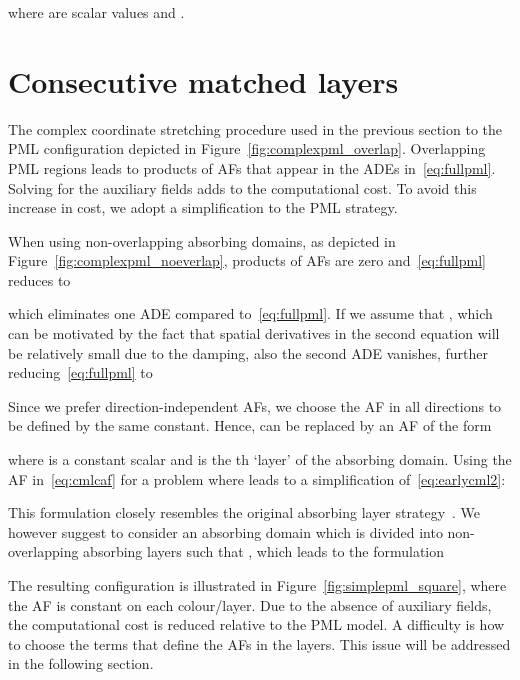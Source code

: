 \documentclass[a4paper]{article}
\begin{document}
where  are scalar values and .

\section{Consecutive matched layers}
\label{sec:cml}

The complex coordinate stretching procedure used in the previous
section to the PML configuration depicted in
Figure~\ref{fig:complexpml_overlap}. Overlapping PML regions leads to
products of AFs that appear in the ADEs in~\eqref{eq:fullpml}. Solving
for the auxiliary fields adds to the computational cost.  To avoid
this increase in cost, we adopt a simplification to the PML strategy.

When using non-overlapping absorbing domains, as depicted in
Figure~\ref{fig:complexpml_noeverlap}, products of AFs are zero
and~\eqref{eq:fullpml} reduces to

which eliminates one ADE compared to~\eqref{eq:fullpml}. If we assume
that , which can be motivated by the fact that
spatial derivatives in the second equation will be relatively small
due to the damping, also the second ADE vanishes, further
reducing~\eqref{eq:fullpml} to

Since we prefer direction-independent AFs, we choose the AF in all
directions to be defined by the same constant. Hence, 
can be replaced by an AF of the form

where  is a constant scalar and  is the th
`layer' of the absorbing domain.  Using the AF in~\eqref{eq:cmlcaf}
for a problem where  leads to a
simplification of~\eqref{eq:earlycml2}:

This formulation closely resembles the original absorbing layer
strategy~\citep{holland83williams}.  We however suggest to consider an
absorbing domain  which is divided into  non-overlapping
absorbing layers  such that , which leads to the formulation

The resulting configuration is illustrated in
Figure~\ref{fig:simplepml_square}, where the AF is constant on each
colour/layer. Due to the absence of auxiliary fields, the
computational cost is reduced relative to the PML model. A difficulty
is how to choose the terms that define the AFs in the layers. This
issue will be addressed in the following section.
\end{document}

